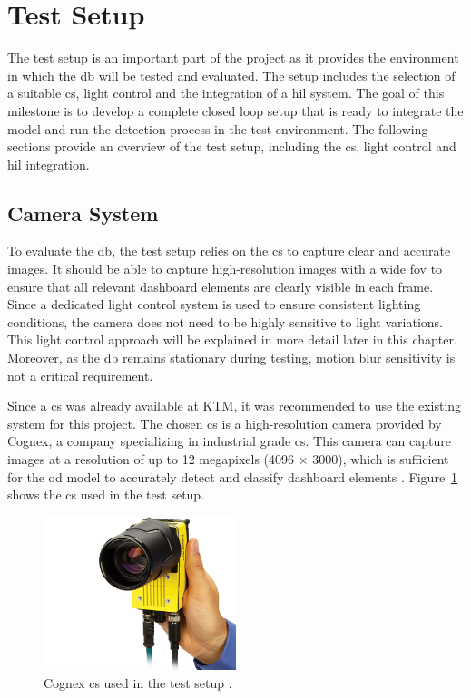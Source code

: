 \section{Test Setup}
The test setup is an important part of the project as it provides the environment in which the \gls{db} will be tested and evaluated. The setup includes the selection of a suitable \gls{cs}, light control and the integration of a \gls{hil} system. The goal of this milestone is to develop a complete closed loop setup that is ready to integrate the model and run the detection process in the test environment. The following sections provide an overview of the test setup, including the \gls{cs}, light control and \gls{hil} integration.

\subsection{Camera System}
To evaluate the \gls{db}, the test setup relies on the \gls{cs} to capture clear and accurate images. It should be able to capture high-resolution images with a wide \gls{fov} to ensure that all relevant dashboard elements are clearly visible in each frame. Since a dedicated light control system is used to ensure consistent lighting conditions, the camera does not need to be highly sensitive to light variations. This light control approach will be explained in more detail later in this chapter. Moreover, as the \gls{db} remains stationary during testing, motion blur sensitivity is not a critical requirement.

Since a \gls{cs} was already available at KTM, it was recommended to use the existing system for this project. The chosen \gls{cs} is a high-resolution camera provided by Cognex, a company specializing in industrial grade \gls{cs}. This camera can capture images at a resolution of up to 12 megapixels (4096 × 3000), which is sufficient for the \gls{od} model to accurately detect and classify dashboard elements \cite{Cognex_Camera}. Figure~\ref{Cognex_Camera} shows the \gls{cs} used in the test setup.

\begin{figure}[!htb]
    \centering
    \includegraphics[width=0.5\textwidth]{Figures/In-Sight 9000 in hand.jpg}
    \caption{Cognex \gls{cs} used in the test setup \cite{Cognex_Camera}.}
    \label{Cognex_Camera}
\end{figure}

